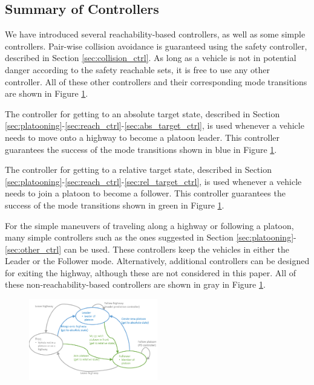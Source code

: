 \subsection{Summary of Controllers}
We have introduced several reachability-based controllers, as well as some simple controllers. Pair-wise collision avoidance is guaranteed using the safety controller, described in Section \ref{sec:collision_ctrl}. As long as a vehicle is not in potential danger according to the safety reachable sets, it is free to use any other controller. All of these other controllers and their corresponding mode transitions are shown in Figure \ref{fig:modeControllers}.

The controller for getting to an absolute target state, described in Section \ref{sec:platooning}-\ref{sec:reach_ctrl}-\ref{sec:abs_target_ctrl}, is used whenever a vehicle needs to move onto a highway to become a platoon leader. This controller guarantees the success of the mode transitions shown in blue in Figure \ref{fig:modeControllers}.

The controller for getting to a relative target state, described in Section \ref{sec:platooning}-\ref{sec:reach_ctrl}-\ref{sec:rel_target_ctrl}, is used whenever a vehicle needs to join a platoon to become a follower. This controller guarantees the success of the mode transitions shown in green in Figure \ref{fig:modeControllers}.

For the simple maneuvers of traveling along a highway or following a platoon, many simple controllers such as the ones suggested in Section \ref{sec:platooning}-\ref{sec:other_ctrl} can be used. These controllers keep the vehicles in either the Leader or the Follower mode. Alternatively, additional controllers can be designed for exiting the highway, although these are not considered in this paper. All of these non-reachability-based controllers are shown in gray in Figure \ref{fig:modeControllers}.

\begin{figure}
	\centering
	\includegraphics[width=0.5\textwidth]{"fig/modeControllers"}
	\caption{}
	\label{fig:modeControllers}
\end{figure}